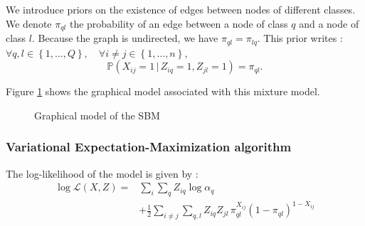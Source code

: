 \documentclass[switch, 12pt]{article}
\begin{document}
\begin{multicols}{2}
    We introduce priors on the existence of edges between nodes of different classes. We denote $\pi_{ql}$ the probability of an edge between a node of class $q$ and a node of class $l$. Because the graph is undirected, we have $\pi_{ql}=\pi_{lq}$. This prior writes : $ \forall q,l\in \left\{1,\dots,Q\right\}, \quad \forall i\neq j\in \left\{1,\dots,n\right\},$
    \begin{equation}
        \label{eq:conditional_distribution}
        \mathbb{P}(X_{ij}=1\,|\,Z_{iq}=1,Z_{jl}=1)=\pi_{ql}.
    \end{equation}

    Figure \ref{fig:graphical_model} shows the graphical model associated with this mixture model.

    \begin{figure}[H]
        \centering
        \caption{Graphical model of the SBM}
        \label{fig:graphical_model}
    \end{figure}


    \subsubsection{Variational Expectation-Maximization algorithm}

    The log-likelihood of the model is given by :
    \begin{equation}
        \begin{aligned}
            \log \mathcal{L}(X, Z) = & \sum_{i}\sum_{q} Z_{iq}\log\alpha_q                                                            \\
                                     & + \frac{1}{2}\sum_{i\neq j}\sum_{q,l} Z_{iq}Z_{jl} \, \pi_{ql}^{X_{ij}}(1-\pi_{ql})^{1-X_{ij}}
        \end{aligned}
    \end{equation}


\end{multicols}
\end{document}
